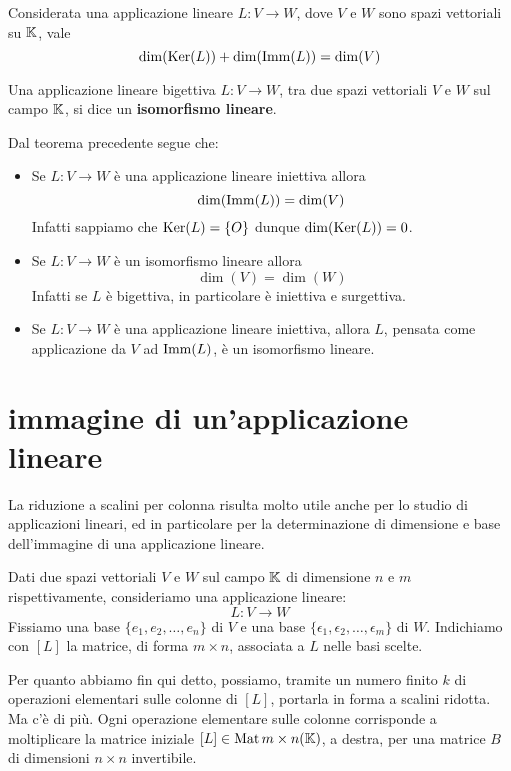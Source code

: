 \begin{theorem}
	Considerata una applicazione lineare $L : V \to W$, dove $V$ e $W$ sono spazi
	vettoriali su $\mathbb{K}$, vale
	\[
		\dim(\operatorname{Ker}(L)) + \dim(\operatorname{Imm}(L)) = \dim(V)
	\]
\end{theorem}

\begin{definition}
	Una applicazione lineare bigettiva $L : V \to W$, tra due spazi vettoriali $V$ e $W$
	sul campo $\mathbb{K}$, si dice un \textbf{isomorfismo lineare}.

	Dal teorema precedente segue che:
	\begin{itemize}
		\item Se $L : V \to W$ è una applicazione lineare iniettiva allora
		      \[ \dim(\operatorname{Imm}(L)) = \dim(V) \]
		      Infatti sappiamo che $\operatorname{Ker}(L) = \{O\}$ dunque $\dim(\operatorname{Ker}(L)) = 0$.
		\item Se $L : V \to W$ è un isomorfismo lineare allora \[\dim(V) = \dim(W)\]
		      Infatti se $L$ è bigettiva, in particolare è iniettiva e surgettiva.
		\item Se $L : V \to W$ è una applicazione lineare iniettiva, allora $L$,
		      pensata come applicazione da $V$ ad $\operatorname{Imm}(L)$, è un isomorfismo lineare.
	\end{itemize}
\end{definition}

\section{immagine di un'applicazione lineare}
La riduzione a scalini per colonna risulta molto utile anche per lo
studio di applicazioni lineari, ed in particolare per la
determinazione di dimensione e base dell'immagine di una applicazione
lineare.

Dati due spazi vettoriali $V$ e $W$ sul campo $\mathbb{K}$ di dimensione $n$
e $m$ rispettivamente, consideriamo una applicazione lineare:
\[
	L : V \to W
\]
Fissiamo una base $\{e_1, e_2, \dots, e_n\}$ di $V$ e una base
$\{\epsilon_1, \epsilon_2, \dots, \epsilon_m\}$ di $W$. Indichiamo con $[L]$
la matrice, di forma $m \times n$, associata a $L$ nelle basi scelte.

Per quanto abbiamo fin qui detto, possiamo, tramite un numero finito $k$ di
operazioni elementari sulle colonne di $[L]$, portarla in forma a scalini
ridotta. Ma c'è di più. Ogni operazione elementare sulle colonne corrisponde
a moltiplicare la matrice iniziale $[L] \in \operatorname{Mat}{m \times n}(\mathbb{K})$,
a destra, per una matrice $B$ di dimensioni $n \times n$ invertibile.

